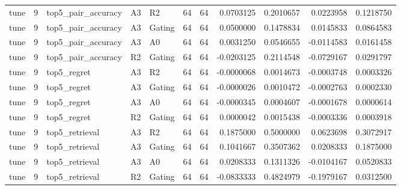 \begin{tabular}{lrlllrrrrrr}
tune & 9 & top5_pair_accuracy & A3 & R2 & 64 & 64 & 0.0703125 & 0.2010657 & 0.0223958 & 0.1218750 \\
tune & 9 & top5_pair_accuracy & A3 & Gating & 64 & 64 & 0.0500000 & 0.1478834 & 0.0145833 & 0.0864583 \\
tune & 9 & top5_pair_accuracy & A3 & A0 & 64 & 64 & 0.0031250 & 0.0546655 & -0.0114583 & 0.0161458 \\
tune & 9 & top5_pair_accuracy & R2 & Gating & 64 & 64 & -0.0203125 & 0.2114548 & -0.0729167 & 0.0291797 \\
tune & 9 & top5_regret & A3 & R2 & 64 & 64 & -0.0000068 & 0.0014673 & -0.0003748 & 0.0003326 \\
tune & 9 & top5_regret & A3 & Gating & 64 & 64 & -0.0000026 & 0.0010472 & -0.0002763 & 0.0002330 \\
tune & 9 & top5_regret & A3 & A0 & 64 & 64 & -0.0000345 & 0.0004607 & -0.0001678 & 0.0000614 \\
tune & 9 & top5_regret & R2 & Gating & 64 & 64 & 0.0000042 & 0.0015438 & -0.0003336 & 0.0003918 \\
tune & 9 & top5_retrieval & A3 & R2 & 64 & 64 & 0.1875000 & 0.5000000 & 0.0623698 & 0.3072917 \\
tune & 9 & top5_retrieval & A3 & Gating & 64 & 64 & 0.1041667 & 0.3507362 & 0.0208333 & 0.1875000 \\
tune & 9 & top5_retrieval & A3 & A0 & 64 & 64 & 0.0208333 & 0.1311326 & -0.0104167 & 0.0520833 \\
tune & 9 & top5_retrieval & R2 & Gating & 64 & 64 & -0.0833333 & 0.4824979 & -0.1979167 & 0.0312500 \\
\bottomrule
\end{tabular}
